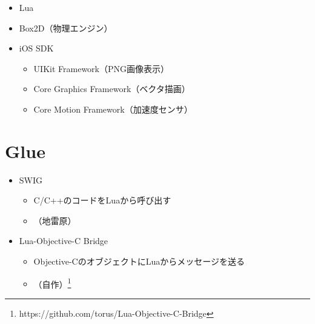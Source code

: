 \documentclass[slide,papersize]{jsarticle}
\begin{document}
\begin{itemize}
 \item Lua
 \item Box2D（物理エンジン）
 \item iOS SDK
       \begin{itemize}
        \item UIKit Framework（PNG画像表示）
        \item Core Graphics Framework（ベクタ描画）
        \item Core Motion Framework（加速度センサ）
       \end{itemize}
\end{itemize}


\section*{Glue}

\begin{itemize}
 \item SWIG
       \begin{itemize}
        \item C/C++のコードをLuaから呼び出す
        \item （地雷原）
       \end{itemize}

 \item Lua-Objective-C Bridge
       \begin{itemize}
        \item Objective-CのオブジェクトにLuaからメッセージを送る
        \item （自作）\footnote{https://github.com/torus/Lua-Objective-C-Bridge}
       \end{itemize}
\end{itemize}
\end{document}
